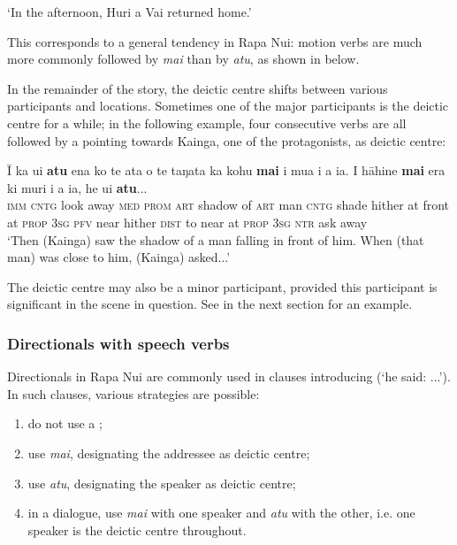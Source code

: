 \glt
‘In the afternoon, Huri a Vai returned home.’ \textstyleExampleref{[R304.009]} 
\z

This corresponds to a general tendency in Rapa Nui: motion verbs are much more commonly followed by \textit{mai} than by \textit{atu}, as shown in  below.

In the remainder of the story, the deictic centre shifts between various participants and locations. Sometimes one of the major participants is the deictic centre for a while; in the following example, four consecutive verbs are all followed by a  pointing towards Kainga, one of the protagonists, as deictic centre:

\ea\label{ex:7.139}
\gll {\ꞌ}Ī ka u{\ꞌ}i \textbf{atu} ena ko te {\ꞌ}ata o te taŋata ka kohu \textbf{mai}  {\ꞌ}i mu{\ꞌ}a i a ia. I hāhine \textbf{mai} era ki muri i a ia, he {\ꞌ}ui \textbf{atu}...\\
\textsc{imm} \textsc{cntg} look away \textsc{med} \textsc{prom} \textsc{art} shadow of \textsc{art} man \textsc{cntg} shade hither  at front at \textsc{prop} \textsc{3sg} \textsc{pfv} near hither \textsc{dist} to near at \textsc{prop} \textsc{3sg} \textsc{ntr} ask away\\

\glt
‘Then (Kainga) saw the shadow of a man falling in front of him. When (that man) was close to him, (Kainga) asked...’ \textstyleExampleref{[R304.095–096]}
\z

The deictic centre may also be a minor participant, provided this participant is significant in the scene in question. See  in the next section for an example. 

\subsubsection[Directionals with speech verbs]{Directionals with speech verbs}\label{sec:7.5.1.3}
Directionals in Rapa Nui are commonly used in clauses introducing  (‘he said: ...’). In such clauses, various strategies are possible:

\begin{enumerate}
\item 
do not use a ;

\item 
use \textit{mai}, designating the addressee as deictic centre;

\item 
use \textit{atu}, designating the speaker as deictic centre;

\item 
in a dialogue, use \textit{mai} with one speaker and \textit{atu} with the other, i.e. one speaker is the deictic centre throughout.

\end{enumerate}

